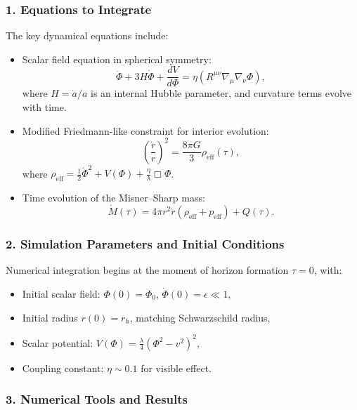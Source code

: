 \documentclass[12pt]{article}
\begin{document}
\subsubsection*{1. Equations to Integrate}

The key dynamical equations include:

\begin{itemize}
    \item Scalar field equation in spherical symmetry:
    \[
    \ddot{\Phi} + 3H \dot{\Phi} + \frac{dV}{d\Phi} = \eta \left( R^{\mu\nu} \nabla_\mu \nabla_\nu \Phi \right),
    \]
    where \( H = \dot{a}/a \) is an internal Hubble parameter, and curvature terms evolve with time.
    
    \item Modified Friedmann-like constraint for interior evolution:
    \[
    \left( \frac{\dot{r}}{r} \right)^2 = \frac{8\pi G}{3} \rho_{\text{eff}}(\tau),
    \]
    where \( \rho_{\text{eff}} = \frac{1}{2} \dot{\Phi}^2 + V(\Phi) + \frac{\eta}{\lambda} \Box \Phi \).

    \item Time evolution of the Misner–Sharp mass:
    \[
    \dot{M}(\tau) = 4\pi r^2 \dot{r} \left( \rho_{\text{eff}} + p_{\text{eff}} \right) + Q(\tau).
    \]
\end{itemize}

\subsubsection*{2. Simulation Parameters and Initial Conditions}

Numerical integration begins at the moment of horizon formation \( \tau = 0 \), with:
\begin{itemize}
    \item Initial scalar field: \( \Phi(0) = \Phi_0 \), \( \dot{\Phi}(0) = \epsilon \ll 1 \),
    \item Initial radius \( r(0) = r_h \), matching Schwarzschild radius,
    \item Scalar potential: \( V(\Phi) = \frac{\lambda}{4}(\Phi^2 - v^2)^2 \),
    \item Coupling constant: \( \eta \sim 0.1 \) for visible effect.
\end{itemize}

\subsubsection*{3. Numerical Tools and Results}
\end{document}
